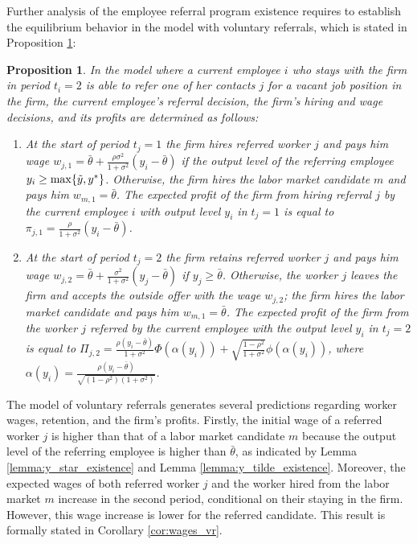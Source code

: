 \documentclass[12pt]{article}
\newtheorem{proposition}{Proposition}
\begin{document}
Further analysis of the employee referral program existence requires to establish the equilibrium behavior in the model with voluntary referrals, which is stated in Proposition \ref{prop:eq_vr}:
\begin{proposition}\label{prop:eq_vr}
    In the model where a current employee $i$ who stays with the firm in period $t_i = 2$ is able to refer one of her contacts $j$ for a vacant job position in the firm, the current employee's referral decision, the firm’s hiring and wage decisions, and its profits are determined as follows:
    \begin{enumerate}[label={\roman*})]
		\item At the start of period $t_j = 1$ the firm hires referred worker $j$ and pays him wage $w_{j,1} = \bar{\theta}+\frac{\rho \sigma^2}{1+\sigma^2} \left(y_i - \bar{\theta}\right)$ if the output level of the referring employee $y_i \geq \max \{ \Tilde{y}, y^* \}$. Otherwise, the firm hires the labor market candidate $m$ and pays him $w_{m,1} = \bar{\theta}$. The expected profit of the firm from hiring referral $j$ by the current employee $i$ with output level $y_i$ in $t_j = 1$ is equal to $\pi_{j,1} = \frac{\rho}{1+\sigma^2}\left(y_i - \bar{\theta}\right)$.
        \item At the start of period $t_j = 2$ the firm retains referred worker $j$ and pays him wage $w_{j,2} = \bar{\theta} + \frac{\sigma^2}{1+\sigma^2}\left( y_j - \bar{\theta} \right)$ if $y_j \geq \bar{\theta}$. Otherwise, the worker $j$ leaves the firm and accepts the outside offer with the wage $w_{j,2}$; the firm hires the labor market candidate and pays him $w_{m,1} = \bar{\theta}$. The expected profit of the firm from the worker $j$ referred by the current employee with the output level $y_i$ in $t_j = 2$ is equal to $\Pi_{j,2} = \frac{\rho\left(y_i-\bar{\theta}\right)}{1 + \sigma^2}\Phi(\alpha(y_i))
        +\sqrt{\frac{1-\rho^2}{1+\sigma^2}}\phi(\alpha(y_i))$, where $\alpha (y_i) = \frac{\rho\left(y_i - \bar{\theta}\right)}{\sqrt{(1-\rho^2)(1+\sigma^2)}}$.
	\end{enumerate}
\end{proposition}

The model of voluntary referrals generates several predictions regarding worker wages, retention, and the firm's profits. Firstly, the initial wage of a referred worker $j$ is higher than that of a labor market candidate $m$ because the output level of the referring employee is higher than $\bar{\theta}$, as indicated by Lemma \ref{lemma:y_star_existence} and Lemma \ref{lemma:y_tilde_existence}. Moreover, the expected wages of both referred worker $j$ and the worker hired from the labor market $m$ increase in the second period, conditional on their staying in the firm. However, this wage increase is lower for the referred candidate. This result is formally stated in Corollary \ref{cor:wages_vr}.
\end{document}
